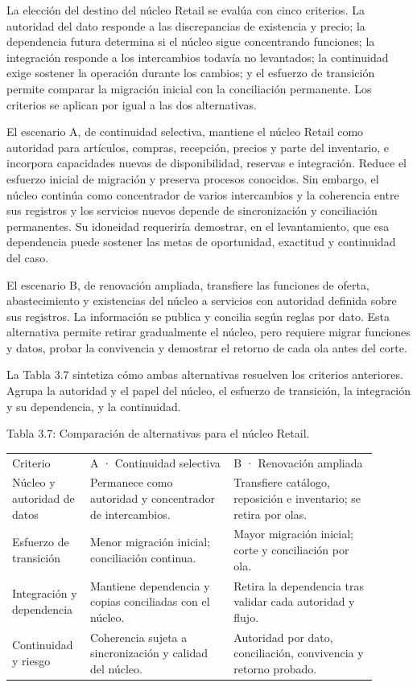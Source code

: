 \documentclass[11pt]{article}
\begin{document}
{La elección del destino del núcleo Retail se evalúa con cinco criterios. La autoridad del dato responde a las discrepancias de existencia y precio; la dependencia futura determina si el núcleo sigue concentrando funciones; la integración responde a los intercambios todavía no levantados; la continuidad exige sostener la operación durante los cambios; y el esfuerzo de transición permite comparar la migración inicial con la conciliación permanente. Los criterios se aplican por igual a las dos alternativas.}

{El escenario A, de continuidad selectiva, mantiene el núcleo Retail como autoridad para artículos, compras, recepción, precios y parte del inventario, e incorpora capacidades nuevas de disponibilidad, reservas e integración. Reduce el esfuerzo inicial de migración y preserva procesos conocidos. Sin embargo, el núcleo continúa como concentrador de varios intercambios y la coherencia entre sus registros y los servicios nuevos depende de sincronización y conciliación permanentes. Su idoneidad requeriría demostrar, en el levantamiento, que esa dependencia puede sostener las metas de oportunidad, exactitud y continuidad del caso.}

{El escenario B, de renovación ampliada, transfiere las funciones de oferta, abastecimiento y existencias del núcleo a servicios con autoridad definida sobre sus registros. La información se publica y concilia según reglas por dato. Esta alternativa permite retirar gradualmente el núcleo, pero requiere migrar funciones y datos, probar la convivencia y demostrar el retorno de cada ola antes del corte.}

{La Tabla 3.7 sintetiza cómo ambas alternativas resuelven los criterios anteriores. Agrupa la autoridad y el papel del núcleo, el esfuerzo de transición, la integración y su dependencia, y la continuidad.}

Tabla 3.7: Comparación de alternativas para el núcleo Retail.

\begin{longtable}{@{}p{0.18\linewidth}p{0.36\linewidth}p{0.36\linewidth}@{}}
\toprule\noalign{}
\endhead
\bottomrule\noalign{}
\endlastfoot
{Criterio} & {A · Continuidad selectiva} & {B · Renovación ampliada} \\
{Núcleo y autoridad de datos} & {Permanece como autoridad y concentrador de intercambios.} & {Transfiere catálogo, reposición e inventario; se retira por olas.} \\
{Esfuerzo de transición} & {Menor migración inicial; conciliación continua.} & {Mayor migración inicial; corte y conciliación por ola.} \\
{Integración y dependencia} & {Mantiene dependencia y copias conciliadas con el núcleo.} & {Retira la dependencia tras validar cada autoridad y flujo.} \\
{Continuidad y riesgo} & {Coherencia sujeta a sincronización y calidad del núcleo.} & {Autoridad por dato, conciliación, convivencia y retorno probado.} \\
\end{longtable}
\end{document}
